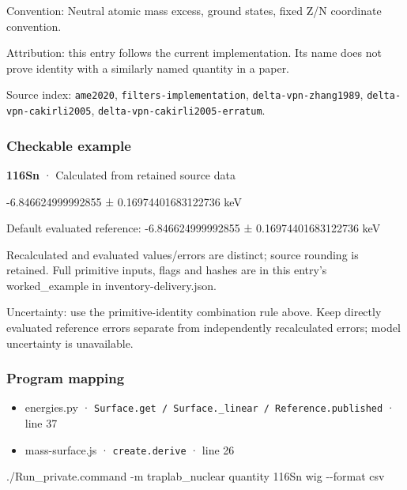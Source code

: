\documentclass[
  11pt,
  letterpaper,
]{article}
\newenvironment{Shaded}{}{}
\newcommand{\AttributeTok}[1]{\textcolor[rgb]{0.49,0.56,0.16}{#1}}
\newcommand{\ExtensionTok}[1]{#1}
\newcommand{\NormalTok}[1]{#1}
\providecommand{\tightlist}{%
  \setlength{\itemsep}{0pt}\setlength{\parskip}{0pt}}
\begin{document}
Convention: Neutral atomic mass excess, ground states, fixed Z/N
coordinate convention.

Attribution: this entry follows the current implementation. Its name
does not prove identity with a similarly named quantity in a paper.

Source index: \texttt{ame2020}, \texttt{filters-implementation},
\texttt{delta-vpn-zhang1989}, \texttt{delta-vpn-cakirli2005},
\texttt{delta-vpn-cakirli2005-erratum}.

\subsubsection{Checkable example}\label{checkable-example-27}

\textbf{116Sn} · Calculated from retained source data

-6.846624999992855 ± 0.16974401683122736 keV

Default evaluated reference: -6.846624999992855 ± 0.16974401683122736
keV

Recalculated and evaluated values/errors are distinct; source rounding
is retained. Full primitive inputs, flags and hashes are in this entry's
worked\_example in inventory-delivery.json.

Uncertainty: use the primitive-identity combination rule above. Keep
directly evaluated reference errors separate from independently
recalculated errors; model uncertainty is unavailable.

\subsubsection{Program mapping}\label{program-mapping-27}

\begin{itemize}
\tightlist
\item
  energies.py ·
  \texttt{Surface.get\ /\ Surface.\_linear\ /\ Reference.published} ·
  line 37
\item
  mass-surface.js · \texttt{create.derive} · line 26
\end{itemize}

\begin{Shaded}
\begin{Highlighting}[]
\ExtensionTok{./Run\_private.command} \AttributeTok{{-}m}\NormalTok{ traplab\_nuclear quantity 116Sn wig }\AttributeTok{{-}{-}format}\NormalTok{ csv}
\end{Highlighting}
\end{Shaded}
\end{document}
